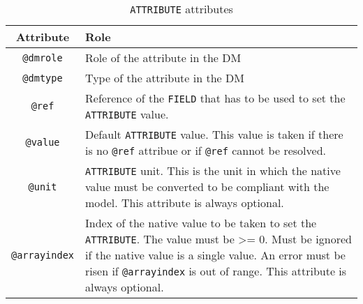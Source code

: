 \begin{table}[!htbp]
\small
\centering
\begin{tabulary}{\linewidth}{|c|J|}       
       \hline 
            \textbf{Attribute} & 
            \textbf {Role}\\
       \hline         \hline  
            \texttt{@dmrole} & 
            Role of the attribute in the DM\\
        \hline 
            \texttt{@dmtype} & 
            Type of the attribute in the DM\\
        \hline 
            \texttt{@ref} & 
            Reference of the \texttt{FIELD} that has to be used to set the 
            \texttt{ATTRIBUTE} value.\\
        \hline 
            \texttt{@value}  &
            Default \texttt{ATTRIBUTE} value. This value is taken if there is no 
            \texttt{@ref} attribue or if \texttt{@ref} cannot be resolved.\\
        \hline 
            \texttt{@unit} & 
            \texttt{ATTRIBUTE} unit. This is the unit in which the native value must be 
            converted to be compliant with the model. This attribute is always optional.\\
        \hline 
            \texttt{@arrayindex} & 
            Index of the native value to be taken to set the \texttt{ATTRIBUTE}. 
            The value must be >= 0.
            Must be ignored if the native value is a single value. 
            An error must be risen if \texttt{@arrayindex} is out of range.
            This attribute is always optional.\\
        \hline 
     \end{tabulary}
     \caption{\texttt{ATTRIBUTE} attributes} 
     \label{tbl:attribute-att}
 \end{table}

